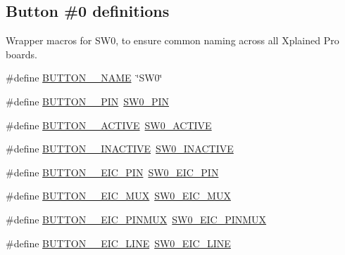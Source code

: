 \subsection*{Button \#0 definitions}
\label{_amgrpdb8ef24fb7da9ad0f7f88fb0a7d7347e}%
Wrapper macros for S\+W0, to ensure common naming across all Xplained Pro boards. \begin{DoxyCompactItemize}
\item 
\#define \mbox{\hyperlink{group__samd21__xplained__pro__features__group_ga20c6ec898ac72b49ab8e52d034ad1e2b}{B\+U\+T\+T\+O\+N\+\_\+\_\+\+N\+A\+ME}}~\char`\"{}S\+W0\char`\"{}
\item 
\#define \mbox{\hyperlink{group__samd21__xplained__pro__features__group_ga6cb077072b69f695f7bcc057da12919f}{B\+U\+T\+T\+O\+N\+\_\+\_\+\+P\+IN}}~\mbox{\hyperlink{group__samd21__xplained__pro__features__group_ga1db7ea1df7a18b3749ee2eaaa2f2d0af}{S\+W0\+\_\+\+P\+IN}}
\item 
\#define \mbox{\hyperlink{group__samd21__xplained__pro__features__group_gab2f863849e05ec54d451ac536f4b5031}{B\+U\+T\+T\+O\+N\+\_\+\_\+\+A\+C\+T\+I\+VE}}~\mbox{\hyperlink{group__samd21__xplained__pro__features__group_gac534d0b05a26a80e6e8e83a049b80655}{S\+W0\+\_\+\+A\+C\+T\+I\+VE}}
\item 
\#define \mbox{\hyperlink{group__samd21__xplained__pro__features__group_ga54119bf75db09e383bfd9c3571fc4efe}{B\+U\+T\+T\+O\+N\+\_\+\_\+\+I\+N\+A\+C\+T\+I\+VE}}~\mbox{\hyperlink{group__samd21__xplained__pro__features__group_ga74eeefc6abe579addaec6ac2bff4d080}{S\+W0\+\_\+\+I\+N\+A\+C\+T\+I\+VE}}
\item 
\#define \mbox{\hyperlink{group__samd21__xplained__pro__features__group_gaa8d94c804e6a74a033e09e8267069fc5}{B\+U\+T\+T\+O\+N\+\_\+\_\+\+E\+I\+C\+\_\+\+P\+IN}}~\mbox{\hyperlink{group__samd21__xplained__pro__features__group_gac9d5ae203ecf805717134dfcee12372b}{S\+W0\+\_\+\+E\+I\+C\+\_\+\+P\+IN}}
\item 
\#define \mbox{\hyperlink{group__samd21__xplained__pro__features__group_ga2b85ab2cdabcc349b8b6f9e8fa9ac119}{B\+U\+T\+T\+O\+N\+\_\+\_\+\+E\+I\+C\+\_\+\+M\+UX}}~\mbox{\hyperlink{group__samd21__xplained__pro__features__group_ga18b3e713457ceaf39e36dbccd8f200fa}{S\+W0\+\_\+\+E\+I\+C\+\_\+\+M\+UX}}
\item 
\#define \mbox{\hyperlink{group__samd21__xplained__pro__features__group_gaca27ba0c8056196203f06d40cdeb7854}{B\+U\+T\+T\+O\+N\+\_\+\_\+\+E\+I\+C\+\_\+\+P\+I\+N\+M\+UX}}~\mbox{\hyperlink{group__samd21__xplained__pro__features__group_ga27bc87cdd4caabcd3160ae3a03f297c7}{S\+W0\+\_\+\+E\+I\+C\+\_\+\+P\+I\+N\+M\+UX}}
\item 
\#define \mbox{\hyperlink{group__samd21__xplained__pro__features__group_ga99e3515a27c1a4c1e44e04206c4a1a2c}{B\+U\+T\+T\+O\+N\+\_\+\_\+\+E\+I\+C\+\_\+\+L\+I\+NE}}~\mbox{\hyperlink{group__samd21__xplained__pro__features__group_ga202edaf3ad972f409e83a1fab0f19579}{S\+W0\+\_\+\+E\+I\+C\+\_\+\+L\+I\+NE}}
\end{DoxyCompactItemize}
